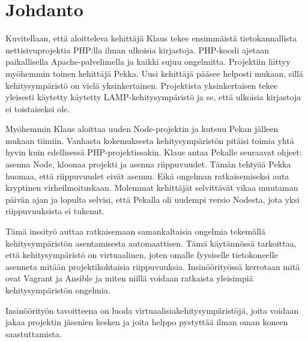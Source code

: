 \chapter{Johdanto}

Kuvitellaan, että aloitteleva kehittäjä Klaus tekee ensimmäistä tietokannallista nettisivuprojektia PHP:lla ilman ulkoisia kirjastoja. PHP-koodi ajetaan paikallisella Apache-palvelimella ja kaikki sujuu ongelmitta. Projektiin liittyy myöhemmin toinen kehittäjä Pekka. Uusi kehittäjä pääsee helposti mukaan, sillä kehitysympäristö on vielä yksinkertainen. Projektista yksinkertaisen tekee yleisesti käytetty käytetty LAMP-kehitysympäristö ja se, että ulkoisia kirjastoja ei toistaiseksi ole.

Myöhemmin Klaus aloittaa uuden Node-projektin ja kutsuu Pekan jälleen mukaan tiimiin. Vanhasta kokemuksesta kehitysympäristön pitäisi toimia yhtä hyvin kuin edellisessä PHP-projektissakin. Klaus antaa Pekalle seuraavat ohjeet: asenna Node, kloonaa projekti ja asenna riippuvuudet. Tämän tehtyää Pekka huomaa, että riippuvuudet eivät asennu. Eikä ongelman ratkaisemiseksi auta kryptinen virheilmoituskaan. Molemmat kehittäjät selvittävät vikaa muutaman päivän ajan ja lopulta selvisi, että Pekalla oli uudempi versio Nodesta, jota yksi riippuvuuksista ei tukenut.

Tämä inssityö auttaa ratkaisemaan samankaltaisia ongelmia tekemällä  kehitysympäristön asentamisesta automaattisen. Tämä käytännössä tarkoittaa, että kehitysympäristö on virtuaalinen, joten omalle fyysiselle tietokoneelle asenneta mitään projektikohtaisia riippuvuuksia. Insinöörityössä kerrotaan mitä ovat Vagrant ja Ansible ja miten niillä voidaan ratkaista yleisimpiä kehitysympäristön ongelmia.

Insinöörityön tavoitteena on luoda virtuaalisiakehitysympäristöjä, joita voidaan jakaa projektin jäsenien kesken ja joita helppo pystyttää ilman oman koneen saastuttamista.
